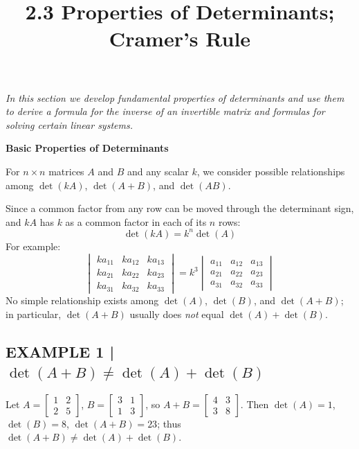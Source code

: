 \documentclass{article}
\title{2.3 Properties of Determinants; Cramer's Rule}
\date{}
\author{}
\newcommand{\redheading}[1]{{\vspace{2mm}\noindent\Large\bfseries\color{red!55!black} #1\par}\vspace{2mm}}
\theoremstyle{mystyle}
\begin{document}
\maketitle

{\itshape\color{blue!45!black}
In this section we develop fundamental properties of determinants and use them to derive
a formula for the inverse of an invertible matrix and formulas for solving certain linear systems.\par}

\vspace{2mm}

\redheading{Basic Properties of Determinants}

For $n\times n$ matrices $A$ and $B$ and any scalar $k$, we consider possible relationships
among $\det(kA)$, $\det(A+B)$, and $\det(AB)$.

Since a common factor from any row can be moved through the determinant sign, and $kA$
has $k$ as a common factor in each of its $n$ rows:
\begin{equation}
\boxed{\det(kA)=k^n\det(A)} \tag{1}
\end{equation}
For example:
\[
\begin{vmatrix}ka_{11}&ka_{12}&ka_{13}\\ka_{21}&ka_{22}&ka_{23}\\ka_{31}&ka_{32}&ka_{33}\end{vmatrix}
=k^3\begin{vmatrix}a_{11}&a_{12}&a_{13}\\a_{21}&a_{22}&a_{23}\\a_{31}&a_{32}&a_{33}\end{vmatrix}
\]
No simple relationship exists among $\det(A)$, $\det(B)$, and $\det(A+B)$; in particular,
$\det(A+B)$ usually does \emph{not} equal $\det(A)+\det(B)$.

\subsection*{EXAMPLE 1 | $\det(A+B)\neq\det(A)+\det(B)$}

Let $A=\begin{bmatrix}1&2\\2&5\end{bmatrix}$, $B=\begin{bmatrix}3&1\\1&3\end{bmatrix}$, so
$A+B=\begin{bmatrix}4&3\\3&8\end{bmatrix}$.
Then $\det(A)=1$, $\det(B)=8$, $\det(A+B)=23$; thus $\det(A+B)\neq\det(A)+\det(B)$.
\end{document}
